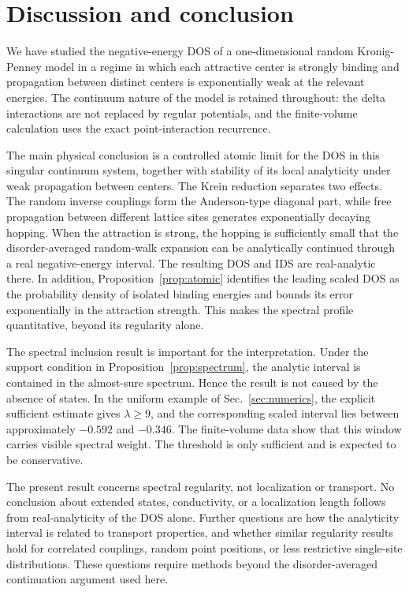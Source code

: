 \documentclass[12pt,a4paper]{article}
\numberwithin{equation}{section}
\begin{document}
\section{Discussion and conclusion}\label{sec:discussion}

We have studied the negative-energy DOS of a one-dimensional random
Kronig-Penney model in a regime in which each attractive center is strongly
binding and propagation between distinct centers is exponentially weak at the
relevant energies.  The continuum nature of the model is retained throughout:
the delta interactions are not replaced by regular potentials, and the
finite-volume calculation uses the exact point-interaction recurrence.

The main physical conclusion is a controlled atomic limit for the DOS in this
singular continuum system, together with stability of its local analyticity
under weak propagation between centers.  The Krein
reduction separates two effects.  The random inverse couplings form the
Anderson-type diagonal part, while free propagation between different lattice
sites generates exponentially decaying hopping.  When the attraction is
strong, the hopping is sufficiently small that the disorder-averaged
random-walk expansion can be analytically continued through a real
negative-energy interval.  The resulting DOS and IDS are real-analytic there.  In addition,
Proposition~\ref{prop:atomic} identifies the leading scaled DOS as the
probability density of isolated binding energies and bounds its error
exponentially in the attraction strength.  This makes the spectral profile
quantitative, beyond its regularity alone.

The spectral inclusion result is important for the interpretation.  Under the
support condition in Proposition~\ref{prop:spectrum}, the analytic interval is
contained in the almost-sure spectrum.  Hence the result is not caused by the
absence of states.  In the uniform example of Sec.~\ref{sec:numerics}, the
explicit sufficient estimate gives $\lambda\ge9$, and the corresponding
scaled interval lies between approximately $-0.592$ and $-0.346$.  The
finite-volume data show that this window carries visible spectral weight.  The
threshold is only sufficient and is expected to be conservative.

The present result concerns spectral regularity, not localization or
transport.  No conclusion about extended states, conductivity, or a
localization length follows from real-analyticity of the DOS alone.  Further questions are how the analyticity interval is related to
transport properties, and whether similar regularity results hold for
correlated couplings, random point positions, or less restrictive
single-site distributions.  These questions require methods beyond the
disorder-averaged continuation argument used here.
\end{document}
